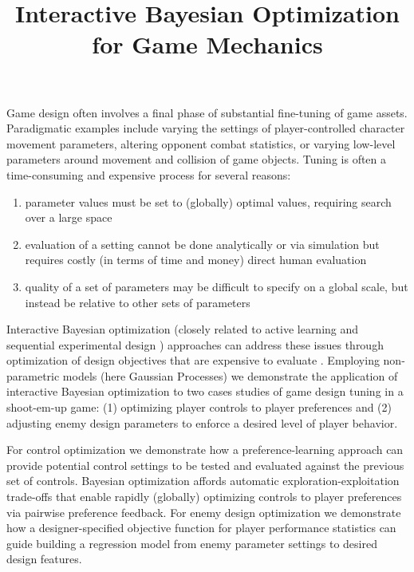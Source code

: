 \documentclass[letterpaper]{article}
\begin{document}
%
\title{Interactive Bayesian Optimization for Game Mechanics}
\author{
}



\maketitle
\begin{abstract}
\begin{quote}
\end{quote}
\end{abstract}

\noindent Game design often involves a final phase of substantial fine-tuning of game assets. Paradigmatic examples include varying the settings of player-controlled character movement parameters, altering opponent combat statistics, or varying low-level parameters around movement and collision of game objects. Tuning is often a time-consuming and expensive process for several reasons:
\begin{enumerate}
\item parameter values must be set to (globally) optimal values, requiring search over a large space
\item evaluation of a setting cannot be done analytically or via simulation but requires costly (in terms of time and money) direct human evaluation
\item quality of a set of parameters may be difficult to specify on a global scale, but instead be relative to other sets of parameters
\end{enumerate}

Interactive Bayesian optimization (closely related to active learning \cite{settles2012:al-book} and sequential experimental design \cite{chaloner1995}) approaches can address these issues through optimization of design objectives that are expensive to evaluate \cite{brochu2010tutorial}. Employing non-parametric models (here Gaussian Processes) we demonstrate the application of interactive Bayesian optimization to two cases studies of game design tuning in a shoot-em-up game: (1) optimizing player controls to player preferences and (2) adjusting enemy design parameters to enforce a desired level of player behavior.

For control optimization we demonstrate how a preference-learning approach can provide potential control settings to be tested and evaluated against the previous set of controls. Bayesian optimization affords automatic exploration-exploitation trade-offs that enable rapidly (globally) optimizing controls to player preferences via pairwise preference feedback. For enemy design optimization we demonstrate how a designer-specified objective function for player performance statistics can guide building a regression model from enemy parameter settings to desired design features.
\end{document}
